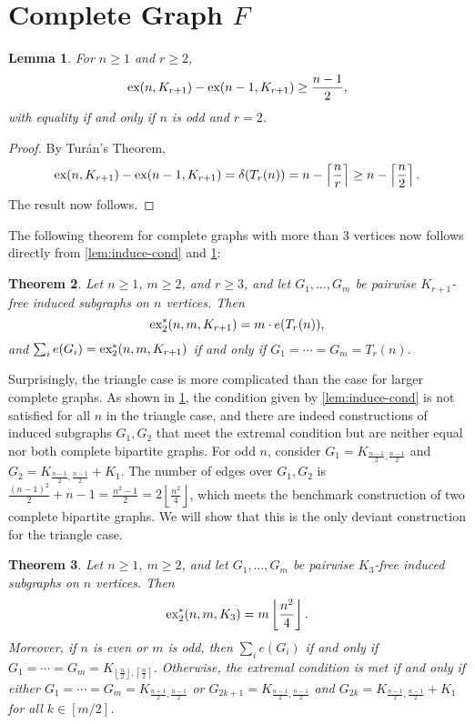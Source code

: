 \documentclass[12pt]{report}
\newtheorem{theorem}{Theorem}[chapter]
\newtheorem{lemma}[theorem]{Lemma}
\newcommand*{\ex}{\textnormal{ex}}
\newcommand*{\dex}{\textnormal{ex}_2}
\begin{document}
\section{Complete Graph $F$}

\begin{lemma}\label{lem:induce-complete-cond}
  For $n \geq 1$ and $r \geq 2$,
  \[
    \ex(n, K_{r + 1}) - \ex(n - 1, K_{r + 1}) \geq \frac{n - 1}{2},
  \]
  with equality if and only if $n$ is odd and $r = 2$.
\end{lemma}

\begin{proof}
  By Turán's Theorem,
  \[
    \ex(n, K_{r + 1}) - \ex(n - 1, K_{r + 1}) = \delta(T_r(n)) = n - \left\lceil \frac{n}{r} \right\rceil \geq n - \left\lceil\frac{n}{2}\right\rceil.
  \]
  The result now follows.
\end{proof}

The following theorem for complete graphs with more than $3$ vertices now follows directly from \cref{lem:induce-cond} and \cref{lem:induce-complete-cond}:

\begin{theorem}\label{thm:induce-complete-no-triangle}
  Let $n \geq 1$, $m \geq 2$, and $r \geq 3$, and let $G_1, \ldots, G_m$ be pairwise $K_{r + 1}$-free induced subgraphs on $n$ vertices. Then
  \[
    \dex^*(n, m, K_{r + 1}) = m \cdot e(T_{r}(n)),
  \]
  and $\sum_i e(G_i) = \dex^*(n, m, K_{r + 1})$ if and only if $G_1 = \cdots = G_m = T_{r}(n)$.
\end{theorem}

Surprisingly, the triangle case is more complicated than the case for larger complete graphs. As shown in \cref{lem:induce-complete-cond}, the condition given by \cref{lem:induce-cond} is not satisfied for all $n$ in the triangle case, and there are indeed constructions of induced subgraphs $G_1, G_2$ that meet the extremal condition but are neither equal nor both complete bipartite graphs. For odd $n$, consider $G_1 = K_{\frac{n - 1}{2}, \frac{n - 1}{2}}$ and $G_2 = K_{\frac{n - 1}{2}, \frac{n - 1}{2}} + K_1$. The number of edges over $G_1, G_2$ is $\frac{(n - 1)^2}{2} + n - 1 = \frac{n^2 - 1}{2} = 2\left\lfloor \frac{n^2}{4}\right\rfloor$, which meets the benchmark construction of two complete bipartite graphs. We will show that this is the only deviant construction for the triangle case.

\begin{theorem}\label{thm:induce-triangle}
  Let $n \geq 1$, $m \geq 2$, and let $G_1, \ldots, G_m$ be pairwise $K_3$-free induced subgraphs on $n$ vertices. Then
  \[
    \dex^*(n, m, K_3) = m \left\lfloor \frac{n^2}{4} \right\rfloor.
  \]
  Moreover, if $n$ is even or $m$ is odd, then $\sum_i e(G_i)$ if and only if $G_1 = \cdots = G_m = K_{\left\lfloor\frac{n}{2}\right\rfloor, \left\lceil\frac{n}{2}\right\rceil}$. Otherwise, the extremal condition is met if and only if either $G_1 = \cdots = G_m = K_{\frac{n + 1}{2}, \frac{n - 1}{2}}$ or $G_{2k + 1} = K_{\frac{n - 1}{2}, \frac{n - 1}{2}}$ and $G_{2k} = K_{\frac{n - 1}{2}, \frac{n - 1}{2}} + K_1$ for all $k \in [m/2]$.
\end{theorem}
\end{document}
